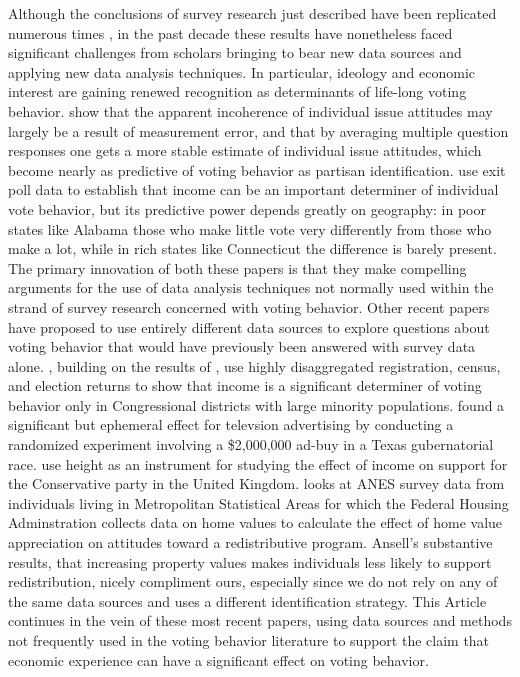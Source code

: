 Although the conclusions of survey research just described have been replicated numerous times \parencite{Nie1976,Smith989,LewisBeck2008}, in the past decade these results have nonetheless faced significant challenges from scholars bringing to bear new data sources and applying new data analysis techniques. In particular, ideology and economic interest are gaining renewed recognition as determinants of life-long voting behavior. \textcite{Ansolabehere2008} show that the apparent incoherence of individual issue attitudes may largely be a result of measurement error, and that by averaging multiple question responses one gets a more stable estimate of individual issue attitudes, which become nearly as predictive of voting behavior as partisan identification.  \textcite{Gelman2007} use exit poll data to establish that income can be an important determiner of individual vote behavior, but its predictive power depends greatly on geography: in poor states like Alabama those who make little vote very differently from those who make a lot, while in rich states like Connecticut the difference is barely present. The primary innovation of both these papers is that they make compelling arguments for the use of data analysis techniques not normally used within the strand of survey research concerned with voting behavior.  Other recent papers have proposed to use entirely different data sources to explore questions about voting behavior that would have previously been answered with survey data alone. \textcite{Hersh2015}, building on the results of \textcite{Gelman2007}, use highly disaggregated registration, census, and election returns to show that income is a significant determiner of voting behavior only in Congressional districts with large minority populations. \textcite{Gerber2011} found a significant but ephemeral effect for televsion advertising by conducting a randomized experiment involving a \$2,000,000 ad-buy in a Texas gubernatorial race. \citeauthor{Arunchalam} use height as an instrument for studying the effect of income on support for the Conservative party in the United Kingdom. \textcite{Ansell2014} looks at ANES survey data from individuals living in Metropolitan Statistical Areas for which the Federal Housing Adminstration collects data on home values to calculate the effect of home value appreciation on attitudes toward a redistributive program. Ansell's substantive results, that increasing property values makes individuals less likely to support redistribution, nicely compliment ours, especially since we do not rely on any of the same data sources and uses a different identification strategy.  This Article continues in the vein of these most recent papers, using data sources and methods not frequently used in the voting behavior literature to support the claim that economic experience can have a significant effect on voting behavior. 



